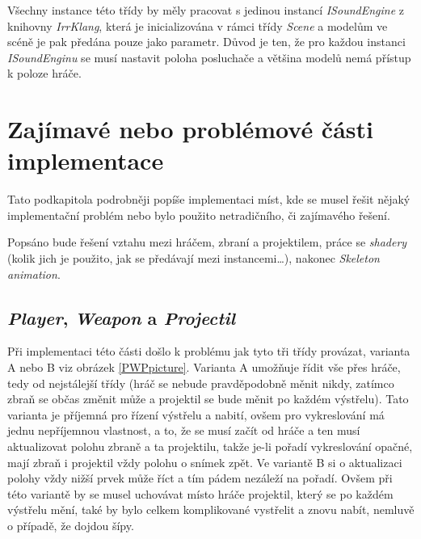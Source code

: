  Všechny instance této třídy by měly pracovat s jedinou instancí \emph{ISoundEngine} z knihovny \emph{IrrKlang}, která je inicializována v rámci třídy \emph{Scene} a modelům ve scéně je pak předána pouze jako parametr. Důvod je ten, že pro každou instanci \emph{ISoundEnginu} se musí nastavit poloha posluchače a většina modelů nemá přístup k poloze hráče. 
\section{Zajímavé nebo problémové části implementace}
Tato podkapitola podrobněji popíše implementaci míst, kde se musel řešit nějaký implementační problém nebo bylo použito netradičního, či zajímavého řešení.

Popsáno bude řešení vztahu mezi hráčem, zbraní a projektilem,  práce se \emph{shadery} (kolik jich je použito, jak se předávají mezi instancemi\dots), nakonec \emph{Skeleton animation}. 
\subsection{\emph{Player}, \emph{Weapon} a \emph{Projectil}}\label{PWP}
Při implementaci této části došlo k problému jak tyto tři třídy provázat, varianta A nebo B viz obrázek \ref{PWPpicture}. Varianta A umožňuje řídit vše přes hráče, tedy od nejstálejší třídy (hráč se nebude pravděpodobně měnit nikdy, zatímco zbraň se občas změnit může a projektil se bude měnit po každém výstřelu). Tato varianta je příjemná pro řízení výstřelu a nabití, ovšem pro vykreslování má jednu nepříjemnou vlastnost, a to, že se musí začít od hráče a ten musí aktualizovat polohu zbraně a ta projektilu, takže je-li pořadí vykreslování opačné, mají zbraň i projektil vždy polohu o snímek zpět. Ve variantě B si o aktualizaci polohy vždy nižší prvek může říct a tím pádem nezáleží na pořadí. Ovšem při této variantě by se musel uchovávat místo hráče projektil, který se po každém výstřelu mění, také by bylo celkem komplikované vystřelit a znovu nabít, nemluvě o případě, že dojdou šípy.

